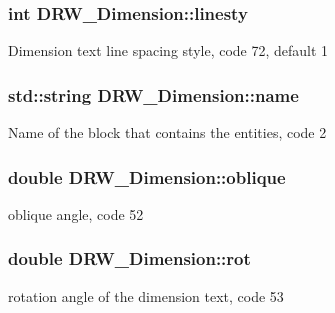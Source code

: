 \subsubsection[{linesty}]{\setlength{\rightskip}{0pt plus 5cm}int D\+R\+W\+\_\+\+Dimension\+::linesty\hspace{0.3cm}{\ttfamily [private]}}\label{class_d_r_w___dimension_a3915235284c71e9e87ec6c4c18b95449}
Dimension text line spacing style, code 72, default 1 \hypertarget{class_d_r_w___dimension_a1aa04de9a7c3db31c2bcccda811eeb6b}{}
\subsubsection[{name}]{\setlength{\rightskip}{0pt plus 5cm}std\+::string D\+R\+W\+\_\+\+Dimension\+::name\hspace{0.3cm}{\ttfamily [private]}}\label{class_d_r_w___dimension_a1aa04de9a7c3db31c2bcccda811eeb6b}
Name of the block that contains the entities, code 2 \hypertarget{class_d_r_w___dimension_a2f0983aa339252883ae945baad31cf34}{}
\subsubsection[{oblique}]{\setlength{\rightskip}{0pt plus 5cm}double D\+R\+W\+\_\+\+Dimension\+::oblique\hspace{0.3cm}{\ttfamily [private]}}\label{class_d_r_w___dimension_a2f0983aa339252883ae945baad31cf34}
oblique angle, code 52 \hypertarget{class_d_r_w___dimension_a57b01df4f4f27aafc4adb56fed4b979d}{}
\subsubsection[{rot}]{\setlength{\rightskip}{0pt plus 5cm}double D\+R\+W\+\_\+\+Dimension\+::rot\hspace{0.3cm}{\ttfamily [private]}}\label{class_d_r_w___dimension_a57b01df4f4f27aafc4adb56fed4b979d}
rotation angle of the dimension text, code 53 \hypertarget{class_d_r_w___dimension_af781a0d7108a2caf9642b4a7cc79b1fb}{}

